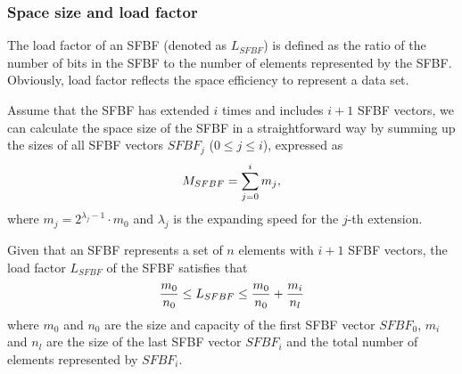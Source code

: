 \documentclass[10pt,journal,compsoc]{IEEEtran}
\begin{document}
\subsubsection{Space size and load factor}
The load factor of an SFBF (denoted as $L_{SFBF}$) is defined as the ratio of the number of bits in the SFBF to the number of elements represented by the SFBF.
Obviously, load factor reflects the space efficiency to represent a data set.

Assume that the SFBF has extended $i$ times and includes $i+1$ SFBF vectors, we can calculate the space size of the SFBF in a straightforward way by summing up the sizes of all SFBF vectors $SFBF_j$ ($0 \le j \le i$), expressed as
\begin{equation}
\footnotesize
{M_{SFBF}} = \sum\limits_{j = 0}^i {{m_j}},
\end{equation}
where ${m_j} = {2^{{\lambda _j} -1 }} \cdot {m_0}$ and  $\lambda _j$ is the expanding speed for the $j$-th extension.
\begin{theorem}
\label{th:Load factor}
Given that an SFBF represents a set of $n$ elements with $i+1$ SFBF vectors, the load factor $L_{SFBF}$ of the SFBF satisfies that
\begin{equation}
\footnotesize
\frac{{{m_0}}}{{{n_0}}} \le {L_{SFBF}} \le \frac{{{m_0}}}{{{n_0}}} + \frac{{{m_i}}}{n_{l}}
\end{equation}
where  $m_0$ and $n_0$ are the size and capacity of the first SFBF vector $SFBF_0$,  $m_i$ and $n_{l}$ are the size of the last SFBF vector $SFBF_i$ and the total number of elements represented by $SFBF_i$.
\end{theorem}
\end{document}
